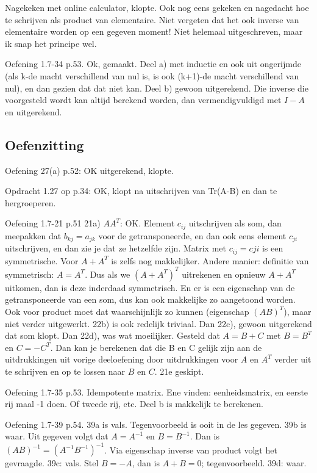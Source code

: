 \documentclass{article}
\begin{document}
Nagekeken met online calculator, klopte. Ook nog eens gekeken en nagedacht hoe te schrijven als product van elementaire. Niet vergeten dat het ook inverse van elementaire worden op een gegeven moment! Niet helemaal uitgeschreven, maar ik snap het principe wel. 

Oefening 1.7-34 p.53. Ok, gemaakt. Deel a) met inductie en ook uit ongerijmde (als k-de macht verschillend van nul is, is ook (k+1)-de macht verschillend van nul), en dan gezien dat dat niet kan. Deel b) gewoon uitgerekend. Die inverse die voorgesteld wordt kan altijd berekend worden, dan vermendigvuldigd met $I-A$ en uitgerekend.


\subsection{Oefenzitting}

Oefening 27(a) p.52: OK uitgerekend, klopte. 

Opdracht 1.27 op p.34: OK, klopt na uitschrijven van Tr(A-B) en dan te hergroeperen. 

Oefening 1.7-21 p.51
21a) $AA^T$: OK. Element $c_{ij}$ uitschrijven als som, dan meepakken dat $b_{kj} = a_{jk}$ voor de getransponeerde, en dan ook eens element $c_{ji}$ uitschrijven, en dan zie je dat ze hetzelfde zijn. Matrix met $c_{ij} = c{ji}$ is een symmetrische. Voor $A+A^T$ is zelfs nog makkelijker. 
Andere manier: definitie van symmetrisch: $A=A^T$. Dus als we $(A+A^T)^T$ uitrekenen en opnieuw $A+A^T$ uitkomen, dan is deze inderdaad symmetrisch. En er is een eigenschap van de getransponeerde van een som, dus kan ook makkelijke zo aangetoond worden. Ook voor product moet dat waarschijnlijk zo kunnen (eigenschap $(AB)^T$), maar niet verder uitgewerkt. 
22b) is ook redelijk triviaal. Dan 22c), gewoon uitgerekend dat som klopt. Dan 22d), was wat moeilijker. Gesteld dat $A=B+C$ met $B=B^T$ en  $C=-C^T$. Dan kan je berekenen dat die B en C gelijk zijn aan de uitdrukkingen uit vorige deeloefening door uitdrukkingen voor $A$ en $A^T$ verder uit te schrijven en op te lossen naar $B$ en $C$. 
21e geskipt. 


Oefening 1.7-35 p.53. Idempotente matrix. Ene vinden: eenheidsmatrix, en eerste rij maal -1 doen. Of tweede rij, etc. Deel b is makkelijk te berekenen. 

Oefening 1.7-39 p.54. 39a is vals. Tegenvoorbeeld is ooit in de les gegeven. 39b is waar. Uit gegeven volgt dat $A=A^{-1}$ en $B=B^{-1}$. Dan is $(AB)^{-1} = (A^{-1}B^{-1})^{-1}$. Via eigenschap inverse van product volgt het gevraagde. 
39c: vals. Stel $B=-A$, dan is $A+B=0$; tegenvoorbeeld.
39d: waar. 
\end{document}
